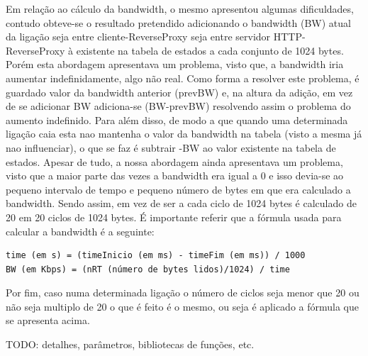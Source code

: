 \documentclass{article}
\begin{document}
{\color{red}
Em relação ao cálculo da bandwidth, o mesmo apresentou algumas dificuldades, contudo obteve-se o resultado pretendido adicionando o bandwidth (BW) atual da ligação seja entre cliente-ReverseProxy seja entre servidor HTTP-ReverseProxy à existente na tabela de estados a cada conjunto de 1024 bytes. Porém esta abordagem apresentava um problema, visto que, a bandwidth iria aumentar indefinidamente, algo não real. Como forma a resolver este problema, é guardado valor da bandwidth anterior (prevBW) e, na altura da adição, em vez de se adicionar BW adiciona-se (BW-prevBW) resolvendo assim o problema do aumento indefinido. Para além disso, de modo a que quando uma determinada ligação caia esta nao mantenha o valor da bandwidth na tabela (visto a mesma já nao influenciar), o que se faz é subtrair -BW ao valor existente na tabela de estados. Apesar de tudo, a nossa abordagem ainda apresentava um problema, visto que a maior parte das vezes a bandwidth era igual a 0 e isso devia-se ao pequeno intervalo de tempo e pequeno número de bytes em que era calculado a bandwidth. Sendo assim, em vez de ser a cada ciclo de 1024 bytes é calculado de 20 em 20 ciclos de 1024 bytes. É importante referir que a fórmula usada para calcular a bandwidth é a seguinte:
\begin{verbatim}
time (em s) = (timeInicio (em ms) - timeFim (em ms)) / 1000
BW (em Kbps) = (nRT (número de bytes lidos)/1024) / time
\end{verbatim}
Por fim, caso numa determinada ligação o número de ciclos seja menor que 20 ou não seja multiplo de 20 o que é feito é o mesmo, ou seja é aplicado a fórmula que se apresenta acima.
}

{\color{red}TODO: detalhes, parâmetros, bibliotecas de funções, etc.}
\end{document}
